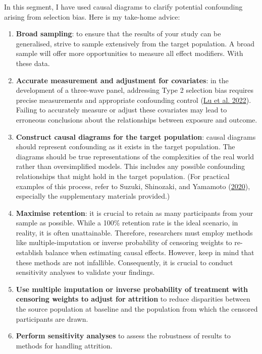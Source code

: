 \documentclass[
  singlecolumn]{report}
\begin{document}
In this segment, I have used causal diagrams to clarify potential
confounding arising from selection bias. Here is my take-home advice:

\begin{enumerate}
\def\labelenumi{\arabic{enumi}.}
\item
  \textbf{Broad sampling}: to ensure that the results of your study can
  be generalised, strive to sample extensively from the target
  population. A broad sample will offer more opportunities to measure
  all effect modifiers. With these data.
\item
  \textbf{Accurate measurement and adjustment for covariates}: in the
  development of a three-wave panel, addressing Type 2 selection bias
  requires precise measurements and appropriate confounding control
  (\protect\hyperlink{ref-lu2022}{Lu et al. 2022}). Failing to
  accurately measure or adjust these covariates may lead to erroneous
  conclusions about the relationships between exposure and outcome.
\item
  \textbf{Construct causal diagrams for the target population}: causal
  diagrams should represent confounding as it exists in the target
  population. The diagrams should be true representations of the
  complexities of the real world rather than oversimplified models. This
  includes any possible confounding relationships that might hold in the
  target population. (For practical examples of this process, refer to
  Suzuki, Shinozaki, and Yamamoto
  (\protect\hyperlink{ref-suzuki2020}{2020}), especially the
  supplementary materials provided.)
\item
  \textbf{Maximise retention}: it is crucial to retain as many
  participants from your sample as possible. While a 100\% retention
  rate is the ideal scenario, in reality, it is often unattainable.
  Therefore, researchers must employ methods like multiple-imputation or
  inverse probability of censoring weights to re-establish balance when
  estimating causal effects. However, keep in mind that these methods
  are not infallible. Consequently, it is crucial to conduct sensitivity
  analyses to validate your findings.
\item
  \textbf{Use multiple imputation or inverse probability of treatment
  with censoring weights to adjust for attrition} to reduce disparities
  between the source population at baseline and the population from
  which the censored participants are drawn.
\item
  \textbf{Perform sensitivity analyses} to assess the robustness of
  results to methods for handling attrition.
\end{enumerate}
\end{document}
